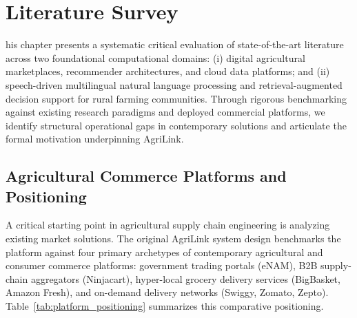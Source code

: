 \chapter{Literature Survey}
\label{ch:Lit}
his chapter presents a systematic critical evaluation of state-of-the-art literature across two foundational computational domains: (i) digital agricultural marketplaces, recommender architectures, and cloud data platforms; and (ii) speech-driven multilingual natural language processing and retrieval-augmented decision support for rural farming communities. Through rigorous benchmarking against existing research paradigms and deployed commercial platforms, we identify structural operational gaps in contemporary solutions and articulate the formal motivation underpinning AgriLink.

\section{Agricultural Commerce Platforms and Positioning}
\label{sec:LitRev_platforms}
A critical starting point in agricultural supply chain engineering is analyzing existing market solutions. The original AgriLink system design benchmarks the platform against four primary archetypes of contemporary agricultural and consumer commerce platforms: government trading portals (eNAM), B2B supply-chain aggregators (Ninjacart), hyper-local grocery delivery services (BigBasket, Amazon Fresh), and on-demand delivery networks (Swiggy, Zomato, Zepto). Table~\ref{tab:platform_positioning} summarizes this comparative positioning.

